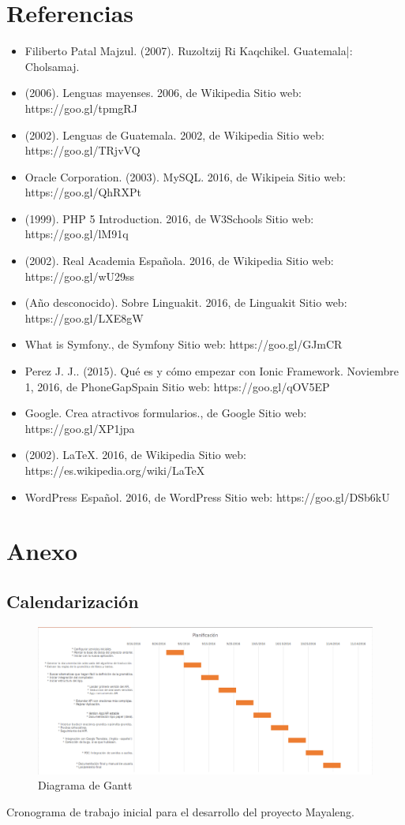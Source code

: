 \documentclass[a4paper,openright,11pt]{article}
\begin{document}
\section{Referencias}
\begin{itemize}
	\item Filiberto Patal Majzul. (2007). Ruzoltzij Ri Kaqchikel. Guatemala|: Cholsamaj.
	\item (2006). Lenguas mayenses. 2006, de Wikipedia Sitio web: https://goo.gl/tpmgRJ
	\item (2002). Lenguas de Guatemala. 2002, de Wikipedia Sitio web: https://goo.gl/TRjvVQ
	\item Oracle Corporation. (2003). MySQL. 2016, de Wikipeia Sitio web: https://goo.gl/QhRXPt
	\item (1999). PHP 5 Introduction. 2016, de W3Schools Sitio web: https://goo.gl/lM91q
	\item (2002). Real Academia Española. 2016, de Wikipedia Sitio web: https://goo.gl/wU29ss
	\item (Año desconocido). Sobre Linguakit. 2016, de Linguakit Sitio web: https://goo.gl/LXE8gW
	\item What is Symfony., de Symfony Sitio web: https://goo.gl/GJmCR
	\item Perez J. J.. (2015). Qué es y cómo empezar con Ionic Framework. Noviembre 1, 2016, de PhoneGapSpain Sitio web: https://goo.gl/qOV5EP
	\item Google. Crea atractivos formularios., de Google Sitio web: https://goo.gl/XP1jpa
	\item (2002). LaTeX. 2016, de Wikipedia Sitio web: https://es.wikipedia.org/wiki/LaTeX
	\item WordPress Español. 2016, de WordPress Sitio web: https://goo.gl/DSb6kU
\end{itemize}
\newpage

\section{Anexo}
\subsection{Calendarización}
\begin{figure}[h]
  \centering
    \includegraphics[width=1.0\textwidth]{Gantt}
  \caption{Diagrama de Gantt}
  \label{fig:gantt}
\end{figure}
Cronograma de trabajo inicial para el desarrollo del proyecto Mayaleng.
\end{document}
